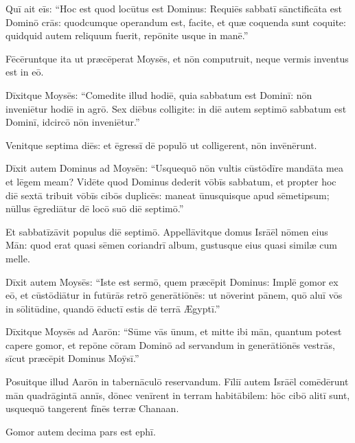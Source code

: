 Quī ait eīs:
``Hoc est quod locūtus est Dominus: Requiēs sabbatī sānctificāta est Dominō crās: quodcumque operandum est, facite, et
quæ coquenda sunt coquite: quidquid autem reliquum fuerit, repōnite usque
in manē.''

Fēcēruntque ita ut præcēperat Moysēs, et nōn computruit, neque
vermis inventus est in eō.

Dīxitque Moysēs: ``Comedite
illud hodiē, quia sabbatum est Dominī: nōn inveniētur
hodiē in agrō. Sex diēbus colligite: in diē autem
septimō sabbatum est Dominī, idcircō nōn
inveniētur.''

Venitque septima diēs: et ēgressī dē populō ut
colligerent, nōn invēnērunt.

Dīxit autem Dominus ad
Moysēn: ``Us\-quequō nōn vultis
cūstōdīre mandāta mea et lēgem meam? Vidēte quod Dominus dederit vōbīs
sabbatum, et propter hoc diē sextā tribuit vōbīs cibōs
duplicēs: maneat ūnusquisque apud sēmetipsum; nūllus
ēgrediātur dē locō suō diē septimō.''

Et sabbatīzāvit
populus diē septimō. \linebreak{}Appellāvitque domus Isrāēl nōmen eius Mān: quod erat quasi sēmen
coriandrī album, gustusque eius quasi
similæ cum melle.

Dīxit autem Moysēs: ``Iste est sermō, quem præcēpit
Dominus: Implē gomor ex eō, et cūstōdiātur in futūrās
retrō generātiōnēs: ut nōverint pānem, quō aluī vōs in sōlitūdine, quandō
ēductī estis dē terrā Ægyptī.''

Dīxitque Moysēs ad Aarōn: ``Sūme vās ūnum,
et mitte ibi mān, quantum potest capere gomor, et repōne cōram Dominō ad
servandum in generātiōnēs vestrās, sīcut præcēpit Dominus Moȳsī.''

Posuitque illud Aarōn in tabernāculō reservandum. Fīliī autem Isrāēl
comēdērunt mān quadrāgintā annīs, dōnec venīrent in terram habitābilem: hōc cibō alitī sunt, usquequō
tangerent fīnēs terræ Chanaan.

Gomor autem decima pars
est ephī.
